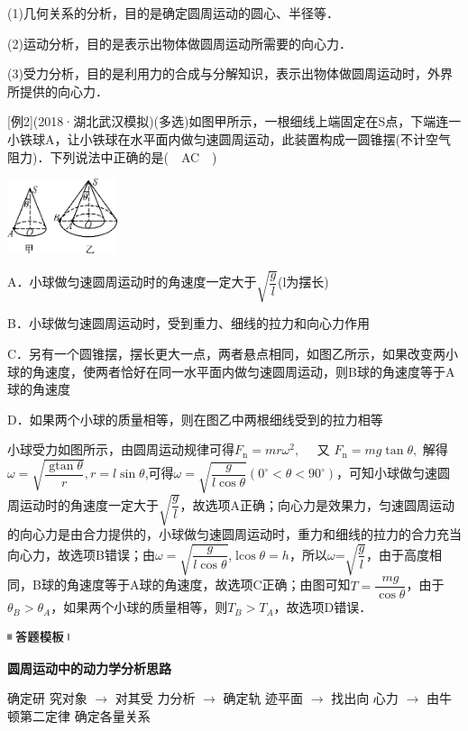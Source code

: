 (1)几何关系的分析，目的是确定圆周运动的圆心、半径等．

(2)运动分析，目的是表示出物体做圆周运动所需要的向心力．

(3)受力分析，目的是利用力的合成与分解知识，表示出物体做圆周运动时，外界所提供的向心力．

{[}例2{]}(2018·湖北武汉模拟)(多选)如图甲所示，一根细线上端固定在S点，下端连一小铁球A，让小铁球在水平面内做匀速圆周运动，此装置构成一圆锥摆(不计空气阻力)．下列说法中正确的是(　AC　)

\begin{center}\includegraphics[width=1.26667in,height=0.86667in]{media/image184.png}\end{center}

A．小球做匀速圆周运动时的角速度一定大于$\sqrt{\dfrac{g}{l}}$(l为摆长)

B．小球做匀速圆周运动时，受到重力、细线的拉力和向心力作用

C．另有一个圆锥摆，摆长更大一点，两者悬点相同，如图乙所示，如果改变两小球的角速度，使两者恰好在同一水平面内做匀速圆周运动，则B球的角速度等于A球的角速度

D．如果两个小球的质量相等，则在图乙中两根细线受到的拉力相等
\begin{solution}
	小球受力如图所示，由圆周运动规律可得$F_{\mathrm{n}}=m r \omega^{2}, \quad$ 又 $F_{\mathrm{n}}=m g \tan \theta,$ 解得 $\omega=\sqrt{\dfrac{\operatorname{gtan} \theta}{r}}, r=l \sin \theta$,可得$\omega=\sqrt{\dfrac{g}{l \cos \theta}}\left(0^{\circ}<\theta<90^{\circ}\right)$，可知小球做匀速圆周运动时的角速度一定大于$\sqrt{\dfrac{g}{l}}$，故选项A正确；向心力是效果力，匀速圆周运动的向心力是由合力提供的，小球做匀速圆周运动时，重力和细线的拉力的合力充当向心力，故选项B错误；由$\omega=\sqrt{\dfrac{g}{l \cos \theta}}$,$\operatorname{lcos} \theta=h$，所以$\omega$=$\sqrt{\dfrac{g}{l}}$，由于高度相同，B球的角速度等于A球的角速度，故选项C正确；由图可知$T=\dfrac{m g}{\cos \theta}$，由于$\theta_{B}>\theta_{A}$，如果两个小球的质量相等，则$T_{B}>T_{A}$，故选项D错误．
\end{solution}

\begin{center}\includegraphics[width=0.71667in,height=0.13333in]{media/image25.png}

\textbf{圆周运动中的动力学分析思路}
\end{center}
确定研
究对象 $\rightarrow$ 对其受
力分析 $\rightarrow$ 确定轨
迹平面 $\rightarrow$ 找出向
心力 $\rightarrow$ 由牛顿第二定律
确定各量关系

